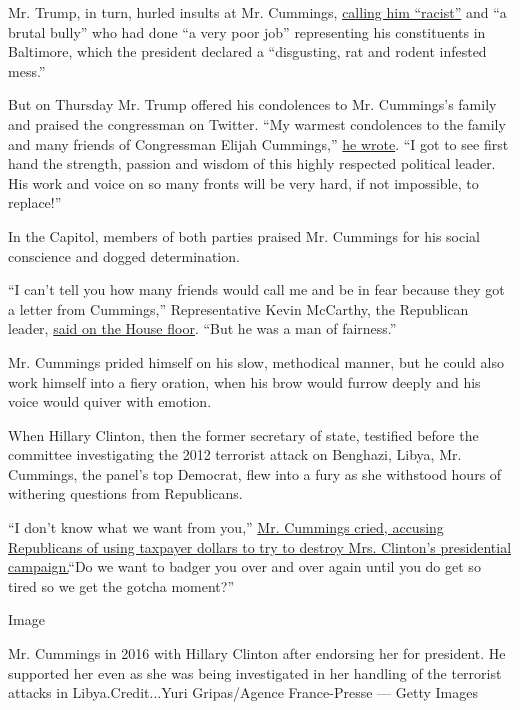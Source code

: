 Mr. Trump, in turn, hurled insults at Mr. Cummings,
\href{https://www.nytimes3xbfgragh.onion/2019/07/28/us/politics/trump-elijah-cummings-baltimore.html}{calling
him ``racist''} and ``a brutal bully'' who had done ``a very poor job''
representing his constituents in Baltimore, which the president declared
a ``disgusting, rat and rodent infested mess.''

But on Thursday Mr. Trump offered his condolences to Mr. Cummings's
family and praised the congressman on Twitter. ``My warmest condolences
to the family and many friends of Congressman Elijah Cummings,''
\href{https://twitter.com/realDonaldTrump/status/1184815052546809862}{he
wrote}. ``I got to see first hand the strength, passion and wisdom of
this highly respected political leader. His work and voice on so many
fronts will be very hard, if not impossible, to replace!''

In the Capitol, members of both parties praised Mr. Cummings for his
social conscience and dogged determination.

``I can't tell you how many friends would call me and be in fear because
they got a letter from Cummings,'' Representative Kevin McCarthy, the
Republican leader,
\href{https://www.c-span.org/video/?465290-5/house-leadership-tributes-representative-elijah-cummings}{said
on the House floor}. ``But he was a man of fairness.''

Mr. Cummings prided himself on his slow, methodical manner, but he could
also work himself into a fiery oration, when his brow would furrow
deeply and his voice would quiver with emotion.

When Hillary Clinton, then the former secretary of state, testified
before the committee investigating the 2012 terrorist attack on
Benghazi, Libya, Mr. Cummings, the panel's top Democrat, flew into a
fury as she withstood hours of withering questions from Republicans.

``I don't know what we want from you,''
\href{https://www.nytimes3xbfgragh.onion/2019/10/17/us/politics/elijah-cummings-death-illness.html?action=click\&module=Top\%20Stories\&pgtype=Homepage}{Mr.
Cummings cried, accusing Republicans of using taxpayer dollars to try to
destroy Mrs. Clinton's presidential campaign.}``Do we want to badger you
over and over again until you do get so tired so we get the gotcha
moment?''

Image

Mr. Cummings in 2016 with Hillary Clinton after endorsing her for
president. He supported her even as she was being investigated in her
handling of the terrorist attacks in Libya.Credit...Yuri Gripas/Agence
France-Presse --- Getty Images

